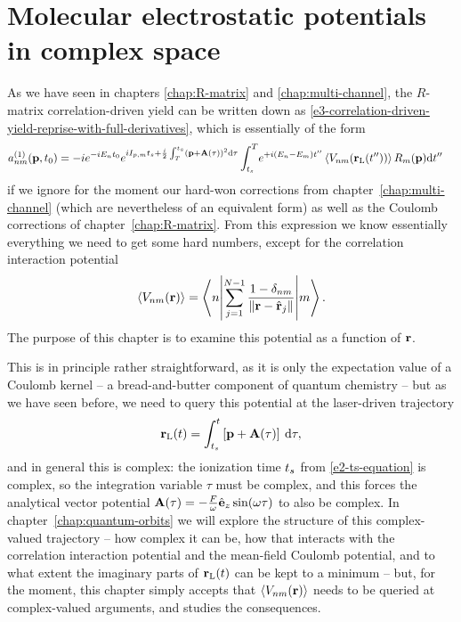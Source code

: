 \chapter{Molecular electrostatic potentials in complex space}
\label{chap:complex-space-potentials}



As we have seen in chapters \ref{chap:R-matrix} and \ref{chap:multi-channel}, the $R$-matrix correlation-driven yield can be written down as \eqref{e3-correlation-driven-yield-reprise-with-full-derivatives}, which is essentially of the form
\begin{align}
a_{nm}^{(1)}(\vb{p},{t_0})
& =
-i
e^{-iE_n {t_0}}
e^{iI_{p,m} {t_s}+\frac{i}{2} \int_T^{{t_s}}\left(\vb{p}+\vb{A}(\tau)\right)^2\mathrm{d}\tau} 
\int_{{t_s}}^T\!
e^{+i(E_n-E_m)t''}
\left\langle V_{nm}\mathopen{}\left( \vb{r}_\mathrm{L}(t'') \right)\mathclose{} \right\rangle
R_m(\vb{p})
\mathrm{d} t''
\label{e4-correlation-driven-yield-recap}
\end{align}
if we ignore for the moment our hard-won corrections from chapter~\ref{chap:multi-channel} (which are nevertheless of an equivalent form) as well as the Coulomb corrections of chapter~\ref{chap:R-matrix}. From this expression we know essentially everything we need to get some hard numbers, except for the correlation interaction potential
\begin{equation}
\Vnm{\vbr}=\matrixel**{n}{\sum_{j=1}^{N-1} \frac{1-\delta_{nm}}{\| \vbr - \hat{\vbr}_j\|} }{m}
.
\label{e4-correlation-interaction-potential-initial}
\end{equation}
The purpose of this chapter is to examine this potential as a function of $\vb{r}$. 

This is in principle rather straightforward, as it is only the expectation value of a Coulomb kernel -- a bread-and-butter component of quantum chemistry -- but as we have seen before, we need to query this potential at the laser-driven trajectory
\begin{equation}
\vb{r}_\mathrm{L}(t) = \int_{{t_s}}^{t} \left[ \vb{p}+\vb{A}(\tau) \right] \: \mathrm{d}\tau,
\end{equation}
and in general this is complex: the ionization time ${t_s}$ from \eqref{e2-ts-equation} is complex, so the integration variable $\tau$ must be complex, and this forces the analytical vector potential $\vb{A}(\tau)=-\frac{F}{\omega}\hat{\vb{e}}_{z} \sin(\omega \tau)$ to also be complex. In chapter~\ref{chap:quantum-orbits} we will explore the structure of this complex-valued trajectory -- how complex it can be, how that interacts with the correlation interaction potential and the mean-field Coulomb potential, and to what extent the imaginary parts of $\vb{r}_\mathrm{L}(t)$ can be kept to a minimum -- but, for the moment, this chapter simply accepts that $\left\langle V_{nm}\mathopen{}\left( \vb{r} \right)\mathclose{} \right\rangle$ needs to be queried at complex-valued arguments, and studies the consequences.


